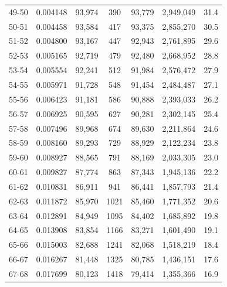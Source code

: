 \documentclass[10pt,a4paper]{article}
\begin{document}
\begin{longtable}{|c|c|c|c|c|c|c|}
49-50  & 0.004148      & 93,974       & 390           & 93,779        & 2,949,049    & 31.4         \\
50-51  & 0.004458      & 93,584       & 417           & 93,375        & 2,855,270    & 30.5         \\
51-52  & 0.004800      & 93,167       & 447           & 92,943        & 2,761,895    & 29.6         \\
52-53  & 0.005165      & 92,719       & 479           & 92,480        & 2,668,952    & 28.8         \\
53-54  & 0.005554      & 92,241       & 512           & 91,984        & 2,576,472    & 27.9         \\
54-55  & 0.005971      & 91,728       & 548           & 91,454        & 2,484,487    & 27.1         \\
55-56  & 0.006423      & 91,181       & 586           & 90,888        & 2,393,033    & 26.2         \\
56-57  & 0.006925      & 90,595       & 627           & 90,281        & 2,302,145    & 25.4         \\
57-58  & 0.007496      & 89,968       & 674           & 89,630        & 2,211,864    & 24.6         \\
58-59  & 0.008160      & 89,293       & 729           & 88,929        & 2,122,234    & 23.8         \\
59-60  & 0.008927      & 88,565       & 791           & 88,169        & 2,033,305    & 23.0         \\
60-61  & 0.009827      & 87,774       & 863           & 87,343        & 1,945,136    & 22.2         \\
61-62  & 0.010831      & 86,911       & 941           & 86,441        & 1,857,793    & 21.4         \\
62-63  & 0.011872      & 85,970       & 1021          & 85,460        & 1,771,352    & 20.6         \\
63-64  & 0.012891      & 84,949       & 1095          & 84,402        & 1,685,892    & 19.8         \\
64-65  & 0.013908      & 83,854       & 1166          & 83,271        & 1,601,490    & 19.1         \\
65-66  & 0.015003      & 82,688       & 1241          & 82,068        & 1,518,219    & 18.4         \\
66-67  & 0.016267      & 81,448       & 1325          & 80,785        & 1,436,151    & 17.6         \\
67-68  & 0.017699      & 80,123       & 1418          & 79,414        & 1,355,366    & 16.9         \\

\end{longtable}
\end{document}
